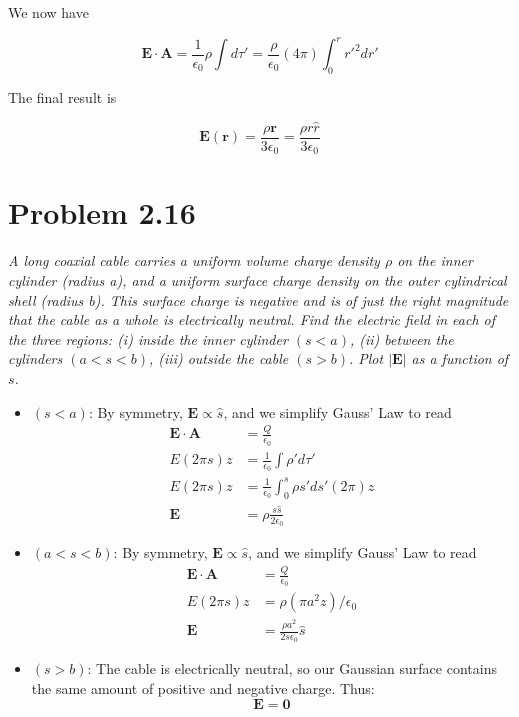 \documentclass[10pt]{article}
\begin{document}
We now have

\begin{equation}
\mathbf{E} \cdot \mathbf{A} = \frac{1}{\epsilon_0} \rho \int d\tau' = \frac{\rho}{\epsilon_0} (4\pi) \int_0^{r} r'^2 dr'
\end{equation}

The final result is

\begin{equation}
\mathbf{E}(\mathbf{r}) = \frac{\rho \mathbf{r}}{3\epsilon_0} = \frac{\rho r\hat{r}}{3\epsilon_0}
\end{equation}

\section{Problem 2.16}

\textit{A long coaxial cable carries a uniform volume charge density $\rho$ on the inner cylinder (radius a), and a uniform surface charge density on the outer cylindrical shell (radius b). This surface charge is negative and is of just the right magnitude that the cable as a whole is electrically neutral.  Find the electric field in each of the three regions: (i) inside the inner cylinder $(s < a)$, (ii) between the cylinders $(a < s < b)$, (iii) outside the cable $(s > b)$.  Plot $|\mathbf{E}|$ as a function of $s$.}

\begin{itemize}
\item $(s < a)$: By symmetry, $\mathbf{E} \propto \hat{s}$, and we simplify Gauss' Law to read 
\begin{align}
\mathbf{E} \cdot \mathbf{A} &= \frac{Q}{\epsilon_0} \\
E (2\pi s) z &= \frac{1}{\epsilon_0}\int \rho' d\tau' \\
E (2\pi s) z &= \frac{1}{\epsilon_0}\int_0^s \rho s'ds' (2\pi) z \\
\mathbf{E} &= \rho \frac{s\hat{s}}{2\epsilon_0}
\end{align}
\item $(a < s < b)$: By symmetry, $\mathbf{E} \propto \hat{s}$, and we simplify Gauss' Law to read
\begin{align}
\mathbf{E} \cdot \mathbf{A} &= \frac{Q}{\epsilon_0} \\
E (2\pi s) z &= \rho (\pi a^2 z)/\epsilon_0 \\
\mathbf{E} &= \frac{\rho a^2}{2 s \epsilon_0}\hat{s}
\end{align}
\item $(s > b)$: The cable is electrically neutral, so our Gaussian surface contains the same amount of positive and negative charge.  Thus:
\begin{equation}
\mathbf{E} = \mathbf{0}
\end{equation}
\end{itemize}
\end{document}
